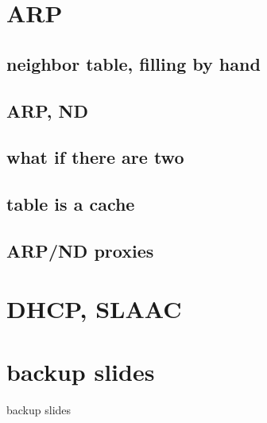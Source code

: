 \section{ARP}

\subsection{neighbor table, filling by hand}


\subsection{ARP, ND}



\subsection{what if there are two}

\subsection{table is a cache}

\subsection{ARP/ND proxies}


\section{DHCP, SLAAC}



\section{backup slides}
\begin{frame}{backup slides}
\end{frame}



